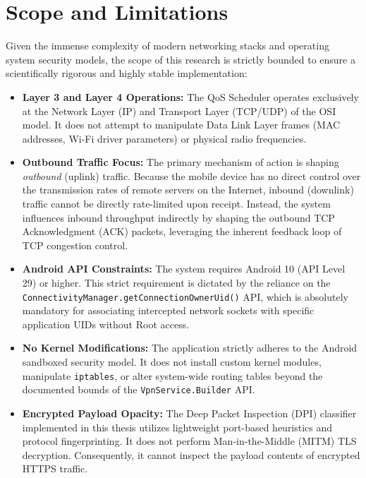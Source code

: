 \section{Scope and Limitations}
\label{sec:scope}

Given the immense complexity of modern networking stacks and operating system security models, the scope of this research is strictly bounded to ensure a scientifically rigorous and highly stable implementation:

\begin{itemize}
    \item \textbf{Layer 3 and Layer 4 Operations:} The QoS Scheduler operates exclusively at the Network Layer (IP) and Transport Layer (TCP/UDP) of the OSI model. It does not attempt to manipulate Data Link Layer frames (MAC addresses, Wi-Fi driver parameters) or physical radio frequencies.
    \item \textbf{Outbound Traffic Focus:} The primary mechanism of action is shaping \textit{outbound} (uplink) traffic. Because the mobile device has no direct control over the transmission rates of remote servers on the Internet, inbound (downlink) traffic cannot be directly rate-limited upon receipt. Instead, the system influences inbound throughput indirectly by shaping the outbound TCP Acknowledgment (ACK) packets, leveraging the inherent feedback loop of TCP congestion control.
    \item \textbf{Android API Constraints:} The system requires Android 10 (API Level 29) or higher. This strict requirement is dictated by the reliance on the \texttt{ConnectivityManager.getConnectionOwnerUid()} API, which is absolutely mandatory for associating intercepted network sockets with specific application UIDs without Root access.
    \item \textbf{No Kernel Modifications:} The application strictly adheres to the Android sandboxed security model. It does not install custom kernel modules, manipulate \texttt{iptables}, or alter system-wide routing tables beyond the documented bounds of the \texttt{VpnService.Builder} API.
    \item \textbf{Encrypted Payload Opacity:} The Deep Packet Inspection (DPI) classifier implemented in this thesis utilizes lightweight port-based heuristics and protocol fingerprinting. It does not perform Man-in-the-Middle (MITM) TLS decryption. Consequently, it cannot inspect the payload contents of encrypted HTTPS traffic.
\end{itemize}

